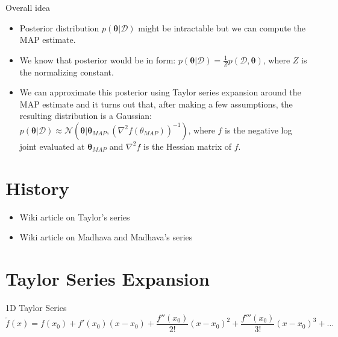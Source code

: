 \documentclass{beamer}
\begin{document}
\begin{frame}{Overall idea}
    \begin{itemize}
        \item Posterior distribution $p(\boldsymbol{\theta}| \mathcal{D})$ might be intractable but we can compute the MAP estimate.
        \item We know that posterior would be in form: $p(\boldsymbol{\theta}| \mathcal{D}) = \frac{1}{Z}p(\mathcal{D}, \boldsymbol{\theta})$, where $Z$ is the normalizing constant.
        \item We can approximate this posterior using Taylor series expansion around the MAP estimate and it turns out that, after making a few assumptions, the resulting distribution is a Gaussian: $p(\boldsymbol{\theta}| \mathcal{D}) \approx \mathcal{N}(\boldsymbol{\theta}|\boldsymbol{\theta}_{MAP}, (\nabla^2f(\theta_{MAP}))^{-1})$, where $f$ is the negative log joint evaluated at $\boldsymbol{\theta}_{MAP}$ and $\nabla^2f$ is the Hessian matrix of $f$.
    \end{itemize}
\end{frame}

\section{History}
\begin{frame}
    \begin{itemize}
        \item Wiki article on Taylor's series
        \item Wiki article on Madhava and Madhava's series
    \end{itemize}
\end{frame}

\section{Taylor Series Expansion}

\begin{frame}{1D Taylor Series}
    \begin{equation*}
        \tilde{f}(x) = f(x_0) + f'(x_0)(x-x_0) + \frac{f''(x_0)}{2!}(x-x_0)^2 + \frac{f'''(x_0)}{3!}(x-x_0)^3 + \dots
    \end{equation*}

\end{frame}
\end{document}
